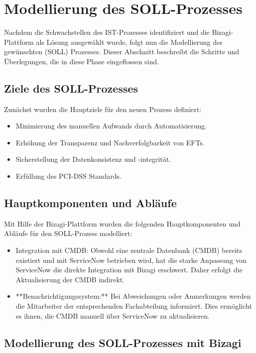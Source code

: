 \documentclass[12pt, a4paper]{article}
\begin{document}
\section{Modellierung des SOLL-Prozesses}

Nachdem die Schwachstellen des IST-Prozesses identifiziert und die Bizagi-Plattform als Lösung ausgewählt wurde, folgt nun die Modellierung des gewünschten (SOLL) Prozesses. 
Dieser Abschnitt beschreibt die Schritte und Überlegungen, die in diese Phase eingeflossen sind.

\subsection{Ziele des SOLL-Prozesses}

Zunächst wurden die Hauptziele für den neuen Prozess definiert:
\begin{itemize}
\item Minimierung des manuellen Aufwands durch Automatisierung.
\item Erhöhung der Transparenz und Nachverfolgbarkeit von EFTs.
\item Sicherstellung der Datenkonsistenz und -integrität.
\item Erfüllung des PCI-DSS Standards.
\end{itemize}

\subsection{Hauptkomponenten und Abläufe}

Mit Hilfe der Bizagi-Plattform wurden die folgenden Hauptkomponenten und Abläufe für den SOLL-Prozess modelliert:

\begin{itemize}
\item Integration mit CMDB: Obwohl eine zentrale Datenbank (CMDB) bereits existiert und mit ServiceNow betrieben wird, hat die starke Anpassung von ServiceNow die 
direkte Integration mit Bizagi erschwert. Daher erfolgt die Aktualisierung der CMDB indirekt.
\item **Benachrichtigungssystem:** Bei Abweichungen oder Anmerkungen werden die Mitarbeiter der entsprechenden Fachabteilung informiert. Dies ermöglicht es ihnen, die 
CMDB manuell über ServiceNow zu aktualisieren.
\end{itemize}

\subsection{Modellierung des SOLL-Prozesses mit Bizagi}
\end{document}
